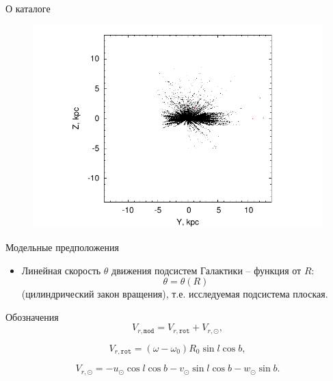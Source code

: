 \documentclass{beamer}
\begin{document}
\begin{frame}{О каталоге}
	\begin{center}
	\begin{figure}[h]
\begin{minipage}[h]{0.8\linewidth}
\includegraphics[width=1\linewidth]{pdf/yz.pdf}
\end{minipage}
\end{figure}
	\end{center}
\end{frame}

\begin{frame}{Модельные предположения}
	\begin{itemize}
		\item Линейная скорость $\theta$ движения подсистем Галактики -- функция от $R$:$$\theta = \theta (R) $$ 
			(цилиндрический закон вращения), т.е. исследуемая подсистема плоская.
	\end{itemize}
\end{frame}

\begin{frame}{Обозначения}
	\begin{equation}
		V_{r, \texttt{mod}} = V_{r, \texttt{rot}} + V_{r, \odot},
	\end{equation}
	
	\begin{equation}
		V_{r, \texttt{rot}} = (\omega - \omega_0)R_0 \sin{l} \cos{b},
	\end{equation}
		
	\begin{equation}
		V_{r, \odot} = -u_{\odot} \cos{l} \cos{b} - v_{\odot} \sin{l} \cos{b} - w_{\odot} \sin{b}.
	\end{equation}
\end{frame}
\end{document}
